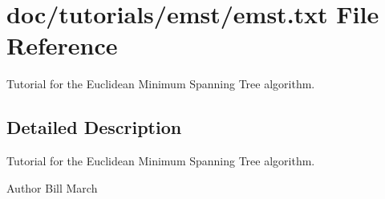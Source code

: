 \section{doc/tutorials/emst/emst.txt File Reference}
\label{emst_8txt}


Tutorial for the Euclidean Minimum Spanning Tree algorithm.  




\subsection{Detailed Description}
Tutorial for the Euclidean Minimum Spanning Tree algorithm. 

\begin{DoxyAuthor}{Author}
Bill March 
\end{DoxyAuthor}
